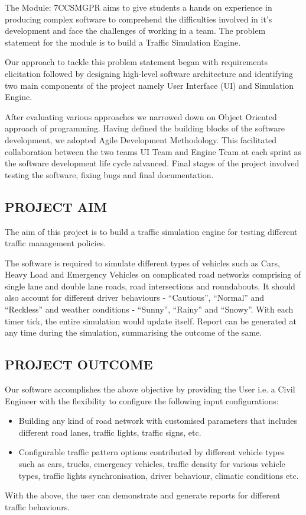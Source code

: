\documentclass[11pt,a4paper]{article}
\begin{document}
	The Module: 7CCSMGPR aims to give students a hands on experience in 
	producing complex software to comprehend the
	difficulties involved in it’s development and face the challenges of
	working in a team. The problem statement for the module is to build a
	Traffic Simulation Engine. 
	
	\setlength{\parindent}{0cm}
	Our approach to tackle this problem statement began with
	requirements elicitation followed by designing high-level software
	architecture and identifying two main components of the project
	namely User Interface (UI) and Simulation Engine. 
	
	\setlength{\parindent}{0cm}
	After evaluating various approaches we narrowed down on Object
	Oriented approach of programming. Having defined the building
	blocks of the software development, we adopted Agile Development
	Methodology. This facilitated collaboration between the two teams 
	UI Team and Engine Team at each sprint as the software development
	life cycle advanced. Final stages of the project involved testing
	the software, fixing bugs and final documentation.

	\subsection{PROJECT AIM}	

	The aim of this project is to build a traffic simulation engine for
	testing different traffic management policies. 
	
	\setlength{\parindent}{0cm}
	The software is required to simulate different types of vehicles such
	as Cars, Heavy Load and Emergency Vehicles on complicated road
	networks comprising of single lane and double lane roads, road
	intersections and roundabouts. It should also account for different
	driver behaviours - “Cautious”, “Normal” and “Reckless” and weather
	conditions - “Sunny”, “Rainy” and “Snowy”. 
	With each timer tick, the entire simulation would update itself. Report
	can be generated at any time during the simulation, summarising the
	outcome of the same.

	\subsection{PROJECT OUTCOME}	

	Our software accomplishes the above objective by providing the User
	i.e. a Civil Engineer with the flexibility to configure the
	following input configurations:
		\begin{itemize}
		\setlength\itemsep{0.2em}
			\item Building any kind of road network with customised parameters that includes different road lanes, traffic lights, traffic signs, etc. 
			\item Configurable traffic pattern options contributed by different vehicle types such as cars, trucks, emergency vehicles, traffic density for various vehicle types, traffic lights synchronisation, driver behaviour, climatic conditions etc. 
		\end{itemize}
	With the above, the user can demonstrate and generate
	reports for different traffic behaviours.	
\end{document}
